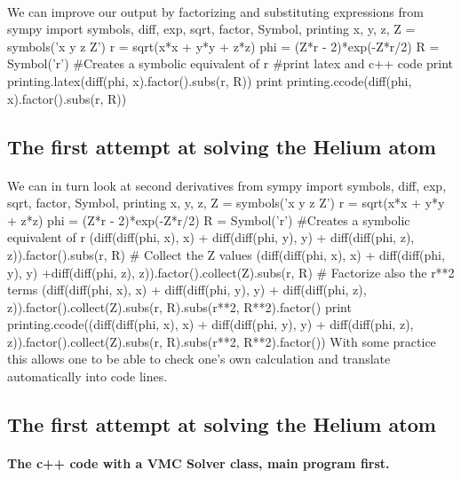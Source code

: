 \documentclass[%
twoside,                 %
final,                   %
10pt]{article}
\begin{document}
\paragraph{}
We can improve our output by factorizing and substituting expressions
\bpycod
from sympy import symbols, diff, exp, sqrt, factor, Symbol, printing
x, y, z, Z = symbols('x y z Z')
r = sqrt(x*x + y*y + z*z)
phi = (Z*r - 2)*exp(-Z*r/2)
R = Symbol('r') #Creates a symbolic equivalent of r
#print latex and c++ code
print printing.latex(diff(phi, x).factor().subs(r, R))
print printing.ccode(diff(phi, x).factor().subs(r, R))
\epycod




\subsection{The first attempt at solving the Helium atom}

\paragraph{}
We can in turn look at second derivatives
\bpycod
from sympy import symbols, diff, exp, sqrt, factor, Symbol, printing
x, y, z, Z = symbols('x y z Z')
r = sqrt(x*x + y*y + z*z)
phi = (Z*r - 2)*exp(-Z*r/2)
R = Symbol('r') #Creates a symbolic equivalent of r
(diff(diff(phi, x), x) + diff(diff(phi, y), y) + diff(diff(phi, z), z)).factor().subs(r, R)
# Collect the Z values
(diff(diff(phi, x), x) + diff(diff(phi, y), y) +diff(diff(phi, z), z)).factor().collect(Z).subs(r, R)
# Factorize also the r**2 terms
(diff(diff(phi, x), x) + diff(diff(phi, y), y) + diff(diff(phi, z), z)).factor().collect(Z).subs(r, R).subs(r**2, R**2).factor()
print printing.ccode((diff(diff(phi, x), x) + diff(diff(phi, y), y) + diff(diff(phi, z), z)).factor().collect(Z).subs(r, R).subs(r**2, R**2).factor())
\epycod
With some practice this allows one to be able to check one's own calculation and translate automatically into code lines.



\subsection{The first attempt at solving the Helium atom}

\paragraph{The c++ code with a VMC Solver class, main program first.}
\end{document}
